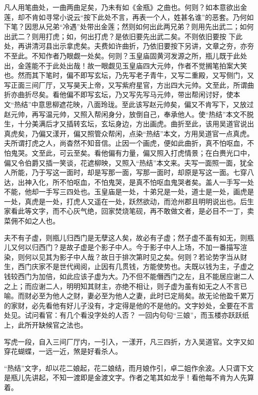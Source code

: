 {凡人用笔曲处，一曲两曲足矣，乃未有如《金瓶》之曲也。何则？如本意欲出金莲，却不肯如寻常小说云“按下此处不言，再表一个人，姓甚名谁”的恶套。乃何如下笔？因思从兄弟“冷遇”处带出金莲；然则如何出此两兄弟？则用先出武二；如何出武二？则用打虎；如，何出打虎？是依旧要先出武二矣。不则依旧要按
下此处，再讲清河县出示拿虎矣。夫费如许曲折，乃依旧要按下另讲，文章之夯，亦夯不至此。不知作者乃眼觑一处矣。何则？玉皇庙固黄河发源之所，瓶儿既于此处出，金莲能不于此处出哉！故一眼觑见玉皇庙四大元帅，作者不觉搁笔拍案大笑也。然而其下笔时，偏不即写玄坛，乃先写老子青牛，又写二重殿，又写侧门，又写正面三间厂厅，又写昊天上帝，又写紫府星官，方出四大元帅。文至此，所谓曲折亦曲折尽矣。看他偏不即写玄坛，乃又写先写马元帅，带出帮闲讨好，使本文“热结”中意思柳遮花映，八面玲珑。至此该写赵元帅矣，偏又不肯写下，又放过赵元帅，再写温元帅，又照入帮闲身分，放倒自己，奉承他人。使“热结”本文不脱生，十分美满后才又插转玄坛，玄坛身边，方出画虎。曲折至此，该用吴道官说出真虎矣，乃偏又漾开，偏又照管众帮闲，点染“热结”本文，方用吴道官一点真虎。夫所谓打虎之人，尚杳然不知音信。止因一个画虎，便如此曲折，真不怕呕血，不怕鬼哭。文至此，可云至矣。看他偏有力量，偏又照入打虎情景；在白赉光口中，偏又令伯爵又插一笑谈，花遮柳映，又照入“热结”本文来。夫写一面照一面，犹全人所能，乃于写这一面时，却是写那一面，写那一面时，却原是写这一面。七穿八达，出神入化，所不怕呕血，不怕鬼哭，是真不怕呕血鬼哭者矣。盖人一手写一处不能，他却一手写三四处也。玉皇庙是一处，十弟兄是一处，道士是一处，画虎是一处，真虎是一处，打虎人又遥在一处，跃然欲动，而沧州郡且明明说出也。后生家看此等文字，而不心灰气绝，回家焚烧笔砚，再不敢做文者，是必目不一丁，卖菜佣不如之人也。

夫不有子虚，则瓶儿归西门是无孽这人矣，故必有子虚；然子虚不虽有如无，则瓶儿又何以归西门？是故子虚是个影子中人。今于影子中人上场，不加一番描写渲染，则何以见其为影子中人哉？故日于排次第时见之矣。何则？若论势字当从财生，西门庆家不是世代阀阅，止因有几贯钱，方能使势也。夫既以钱为主，子虚之钱较西门为加倍，如此应该子虚为大。乃不但不能僭西门之左，且不能居应谢二人之上；而应谢二人，明明知其财主，亦绝不相让，则子虚为虽有如无之人不言已喻。而财必至为他人之财，妻必至为他人之妻，此时已定局矣。故无论他盈千累万的家财，必先看他有好儿子没有，才定得是他的不是他的。文字妙处，全要在不言处见。试问看官：有几个看没字处的人否？
一回内句句“三娘”，而玉楼亦跃跃纸上，此所开缺候官之法也。

写虎一段，自入三间厂厅内，一引入，一漾开，凡三四折，方入吴道官。文字又如穿花蝴蝶，一远一近，煞是好看杀人。

“热结”文字，却以花二娘起，花二娘结，而月娘作引，卓二姐作余波。人只谓下文是瓶儿先讲起，不知一渡即是金渡文字。作者之笔其如龙乎！看他每不肯为人先算着。

}

